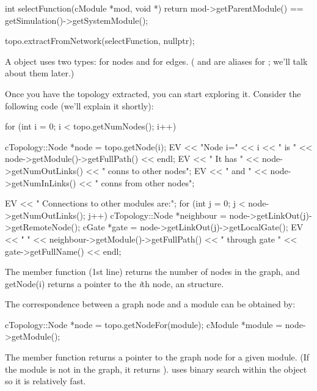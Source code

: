 \begin{cpp}
int selectFunction(cModule *mod, void *)
{
  return mod->getParentModule() == getSimulation()->getSystemModule();
}

topo.extractFromNetwork(selectFunction, nullptr);
\end{cpp}

%
%

A  object uses two types:  for
nodes and  for edges. ( and
 are aliases for ; we'll
talk about them later.)

Once you have the topology extracted, you can start exploring
it. Consider the following code (we'll explain it shortly):

\begin{cpp}
for (int i = 0; i < topo.getNumNodes(); i++) {
  cTopology::Node *node = topo.getNode(i);
  EV << "Node i=" << i << " is " << node->getModule()->getFullPath() << endl;
  EV << " It has " << node->getNumOutLinks() << " conns to other nodes\n";
  EV << " and " << node->getNumInLinks() << " conns from other nodes\n";

  EV << " Connections to other modules are:\n";
  for (int j = 0; j < node->getNumOutLinks(); j++) {
    cTopology::Node *neighbour = node->getLinkOut(j)->getRemoteNode();
    cGate *gate = node->getLinkOut(j)->getLocalGate();
    EV << " " << neighbour->getModule()->getFullPath()
       << " through gate " << gate->getFullName() << endl;
  }
}
\end{cpp}

The  member function (1st line) returns the number of
nodes in the graph, and getNode(i) returns a pointer to the \textit{i}th
node, an  structure.

The correspondence between a graph node and a module can be obtained
by:

\begin{cpp}
cTopology::Node *node = topo.getNodeFor(module);
cModule *module = node->getModule();
\end{cpp}

The  member function returns a pointer to the graph
node for a given module. (If the module is not in the graph, it
returns ).  uses binary search within the
 object so it is relatively fast.

